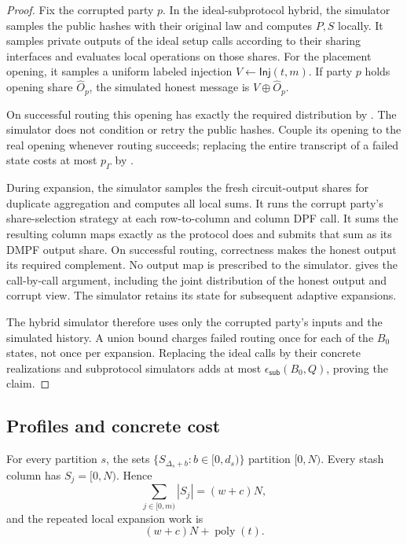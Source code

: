 \begin{proof}
Fix the corrupted party $p$.  In the ideal-subprotocol hybrid, the simulator
samples the public hashes with their original law and computes $P,S$ locally.
It samples private outputs of the ideal setup calls according to their sharing
interfaces and evaluates local operations on those shares.  For the placement
opening, it samples a uniform labeled injection $V\gets\mathsf{Inj}(t,m)$.
If party $p$ holds opening share $\widehat O_p$, the simulated honest message
is $V\oplus\widehat O_p$.

On successful routing this opening has exactly the required distribution by
.  The simulator does
not condition or retry the public hashes.  Couple its opening to the real
opening whenever routing succeeds; replacing the entire transcript of a
failed state costs at most $p_\Gamma$ by
.

During expansion, the simulator samples the fresh circuit-output shares
for duplicate aggregation and computes all local sums. It runs the corrupt
party's share-selection strategy at each row-to-column and column DPF call.
It sums the resulting column maps exactly as the protocol does and submits
that sum as its DMPF output share. On successful routing, correctness makes
the honest output its required complement. No output map is prescribed to
the simulator.  gives the call-by-call
argument, including the joint distribution of the honest output and corrupt
view. The simulator retains its state for subsequent adaptive expansions.

The hybrid simulator therefore uses only the corrupted party's inputs and
the simulated history. A union bound charges failed routing once for each of the $B_0$
states, not once per expansion.  Replacing the ideal calls by their concrete
realizations and subprotocol simulators adds at most
$\epsilon_{\mathsf{sub}}(B_0,Q)$, proving the claim.
\end{proof}

\subsection{Profiles and concrete cost}\label{sec:waterfallParameters}

For every partition $s$, the sets
$\{S_{\Delta_s+b}:b\in[0,d_s)\}$ partition $[0,N)$.  Every stash column has
$S_j=[0,N)$.  Hence
\begin{equation}\label{eq:waterfall-position-map-size}
 \sum_{j\in[0,m)}|S_j|=(w+c)N,
\end{equation}
and the repeated local expansion work is
\begin{equation}\label{eq:waterfall-expansion-cost}
 (w+c)N+\operatorname{poly}(t).
\end{equation}

